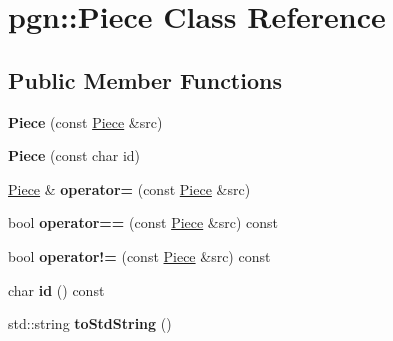 \hypertarget{classpgn_1_1Piece}{
\section{pgn::Piece Class Reference}
\label{classpgn_1_1Piece}
}
\subsection*{Public Member Functions}
\begin{DoxyCompactItemize}
\item 
\hypertarget{classpgn_1_1Piece_af0305d81e8283a29fc7e8786c74b5cf1}{
{\bfseries Piece} (const \hyperlink{classpgn_1_1Piece}{Piece} \&src)}
\label{classpgn_1_1Piece_af0305d81e8283a29fc7e8786c74b5cf1}

\item 
\hypertarget{classpgn_1_1Piece_ab39df1c0401fa2cfb90b94a8b0eb410c}{
{\bfseries Piece} (const char id)}
\label{classpgn_1_1Piece_ab39df1c0401fa2cfb90b94a8b0eb410c}

\item 
\hypertarget{classpgn_1_1Piece_abee444556158376a5d8f57f51af1d4ef}{
\hyperlink{classpgn_1_1Piece}{Piece} \& {\bfseries operator=} (const \hyperlink{classpgn_1_1Piece}{Piece} \&src)}
\label{classpgn_1_1Piece_abee444556158376a5d8f57f51af1d4ef}

\item 
\hypertarget{classpgn_1_1Piece_a38386813c648102af22c3c1c8cf49a18}{
bool {\bfseries operator==} (const \hyperlink{classpgn_1_1Piece}{Piece} \&src) const }
\label{classpgn_1_1Piece_a38386813c648102af22c3c1c8cf49a18}

\item 
\hypertarget{classpgn_1_1Piece_ad149a320e4284db2b41a1656a1169b9e}{
bool {\bfseries operator!=} (const \hyperlink{classpgn_1_1Piece}{Piece} \&src) const }
\label{classpgn_1_1Piece_ad149a320e4284db2b41a1656a1169b9e}

\item 
\hypertarget{classpgn_1_1Piece_a99ce526ff5b97566a443195501863765}{
char {\bfseries id} () const }
\label{classpgn_1_1Piece_a99ce526ff5b97566a443195501863765}

\item 
\hypertarget{classpgn_1_1Piece_acf7de75ac500c61c6c85deec8ded37fe}{
std::string {\bfseries toStdString} ()}
\label{classpgn_1_1Piece_acf7de75ac500c61c6c85deec8ded37fe}

\end{DoxyCompactItemize}
